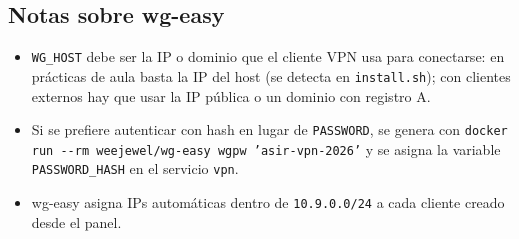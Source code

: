 \documentclass[11pt]{article}
\begin{document}
\subsection{Notas sobre wg-easy}
\label{sec:org00000a2}
\begin{itemize}
\item \texttt{WG\_HOST} debe ser la IP o dominio que el cliente VPN usa para conectarse: en prácticas de aula basta la IP del host (se detecta en \texttt{install.sh}); con clientes externos hay que usar la IP pública o un dominio con registro A.
\item Si se prefiere autenticar con hash en lugar de \texttt{PASSWORD}, se genera con \texttt{docker run -{}-{}rm weejewel/wg-easy wgpw 'asir-vpn-2026'} y se asigna la variable \texttt{PASSWORD\_HASH} en el servicio \texttt{vpn}.
\item wg-easy asigna IPs automáticas dentro de \texttt{10.9.0.0/24} a cada cliente creado desde el panel.
\end{itemize}
\end{document}

